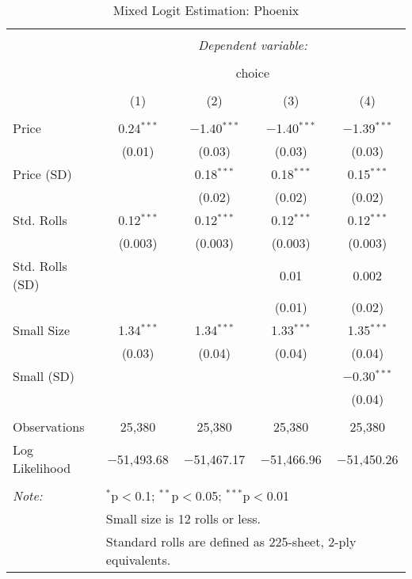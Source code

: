
\begin{table}[!htbp] \centering 
  \caption{Mixed Logit Estimation: Phoenix} 
  \label{tab:mnlPhoenixRandCoefNoObsHet} 
\begin{tabular}{@{\extracolsep{5pt}}lcccc} 
\\[-1.8ex]\hline 
\hline \\[-1.8ex] 
 & \multicolumn{4}{c}{\textit{Dependent variable:}} \\ 
\cline{2-5} 
\\[-1.8ex] & \multicolumn{4}{c}{choice} \\ 
\\[-1.8ex] & (1) & (2) & (3) & (4)\\ 
\hline \\[-1.8ex] 
 Price & 0.24$^{***}$ & $-$1.40$^{***}$ & $-$1.40$^{***}$ & $-$1.39$^{***}$ \\ 
  & (0.01) & (0.03) & (0.03) & (0.03) \\ 
  Price (SD) &  & 0.18$^{***}$ & 0.18$^{***}$ & 0.15$^{***}$ \\ 
  &  & (0.02) & (0.02) & (0.02) \\ 
  Std. Rolls & 0.12$^{***}$ & 0.12$^{***}$ & 0.12$^{***}$ & 0.12$^{***}$ \\ 
  & (0.003) & (0.003) & (0.003) & (0.003) \\ 
  Std. Rolls (SD) &  &  & 0.01 & 0.002 \\ 
  &  &  & (0.01) & (0.02) \\ 
  Small Size & 1.34$^{***}$ & 1.34$^{***}$ & 1.33$^{***}$ & 1.35$^{***}$ \\ 
  & (0.03) & (0.04) & (0.04) & (0.04) \\ 
  Small (SD) &  &  &  & $-$0.30$^{***}$ \\ 
  &  &  &  & (0.04) \\ 
 \hline \\[-1.8ex] 
Observations & 25,380 & 25,380 & 25,380 & 25,380 \\ 
Log Likelihood & $-$51,493.68 & $-$51,467.17 & $-$51,466.96 & $-$51,450.26 \\ 
\hline 
\hline \\[-1.8ex] 
\textit{Note:}  & \multicolumn{4}{l}{$^{*}$p$<$0.1; $^{**}$p$<$0.05; $^{***}$p$<$0.01} \\ 
 & \multicolumn{4}{l}{Small size is 12 rolls or less.} \\ 
 & \multicolumn{4}{l}{Standard rolls are defined as 225-sheet, 2-ply equivalents.} \\ 
\end{tabular} 
\end{table} 
